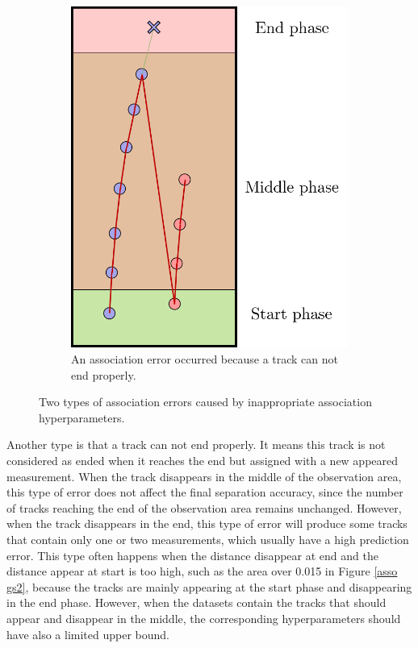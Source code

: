 \begin{figure}[htbp]
\begin{subfigure}[t]{0.3\textwidth}
		\includegraphics[width=\textwidth]{figures/Asso/association error example2.png}
		\caption{An association error occurred because a track can not end properly.}
	\end{subfigure}
	\caption{Two types of association errors caused by inappropriate association hyperparameters.}
	\label{association error example}
\end{figure}



Another type is that a track can not end properly. It means this track is not considered as ended when it reaches the end but assigned with a new appeared measurement. When the track disappears in the middle of the observation area, this type of error does not affect the final separation accuracy, since the number of tracks reaching the end of the observation area remains unchanged. However, when the track disappears in the end, this type of error will produce some tracks that contain only one or two measurements, which usually have a high prediction error. This type often happens when the distance disappear at end and the distance appear at start is too high, such as the area over 0.015 in Figure \ref{asso gs2}, because the tracks are mainly appearing at the start phase and disappearing in the end phase. However, when the datasets contain the tracks that should appear and disappear in the middle, the corresponding hyperparameters should have also a limited upper bound.

